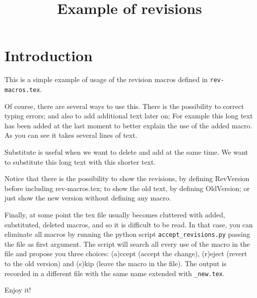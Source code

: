 \documentclass{article}
\title{Example of revisions}
\begin{document}
\maketitle

\section{Introduction}

This is a simple example of usage of the revision
macros defined in \texttt{rev-macros.tex}. 

Of course, there are several ways to use this. There is the
possibility to correct typing errors; and also to add
additional text later on; For example this long text has been
  added at the last moment to better explain the use of the added
  macro. As you can see it takes several lines of text.

Substitute is useful when we want to delete and add at the same
time. We want to substitute this long text with this shorter text.

Notice that there is the possibility to show the revisions, by
  defining RevVersion before including rev-macros.tex; to show the
old text, by defining OldVersion; or just show the new
version without defining any macro.

Finally, at some point the tex file usually becomes cluttered with
added, substituted, deleted macros, and so it is difficult to be
read. In that case, you can eliminate all macros by running the
python script \texttt{accept\_revisions.py} passing the file
as first argument. The script will search all every use of the macro
in the file and propose you three choices: (a)ccept (accept the
  change), (r)eject (revert to the old version) and (s)kip
(leave the macro in the file). The output is recorded in a
different file with the same name extended with \texttt{\_new.tex}.

Enjoy it! 
\end{document}
